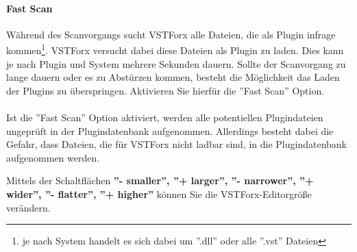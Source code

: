 \paragraph{Fast Scan}
Während des Scanvorgangs sucht VSTForx alle Dateien, die als Plugin infrage kommen\footnote{je nach System handelt es sich dabei um ''.dll'' oder alle ''.vst'' Dateien}. VSTForx versucht dabei diese Dateien als Plugin zu laden. Dies kann je nach Plugin und System mehrere Sekunden dauern. Sollte der Scanvorgang zu lange dauern oder es zu Abstürzen kommen, besteht die Möglichkeit das Laden der Plugins zu überspringen. Aktivieren Sie hierfür die ''Fast Scan'' Option.
\\\\
Ist die ''Fast Scan'' Option aktiviert, werden alle potentiellen Plugindateien ungeprüft in der Plugindatenbank aufgenommen. Allerdings besteht dabei die Gefahr, dass Dateien, die für VSTForx nicht ladbar sind, in die Plugindatenbank aufgenommen werden. 

Mittels der Schaltflächen \textbf{''- smaller'', ''+ larger'', ''- narrower'', ''+ wider'', ''- flatter'', ''+ higher''} können Sie die VSTForx-Editorgröße verändern. 

